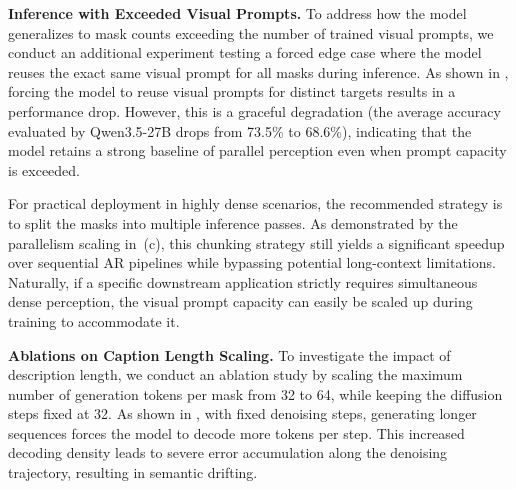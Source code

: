 \documentclass{llmxive}
\providecommand{\arraystretch}{1.3}
\begin{document}
\noindent
\textbf{Inference with Exceeded Visual Prompts.}
To address how the model generalizes to mask counts exceeding the number of trained visual prompts, we conduct an additional experiment testing a forced edge case where the model reuses the exact same visual prompt for all masks during inference. As shown in , forcing the model to reuse visual prompts for distinct targets results in a performance drop. However, this is a graceful degradation (the average accuracy evaluated by Qwen3.5-27B drops from 73.5\% to 68.6\%), indicating that the model retains a strong baseline of parallel perception even when prompt capacity is exceeded. 

For practical deployment in highly dense scenarios, the recommended strategy is to split the masks into multiple inference passes. As demonstrated by the parallelism scaling in~(c), this chunking strategy still yields a significant speedup over sequential AR pipelines while bypassing potential long-context limitations. Naturally, if a specific downstream application strictly requires simultaneous dense perception, the visual prompt capacity can easily be scaled up during training to accommodate it.  

\begin{table}[htbp]
\centering
\setlength{\tabcolsep}{6pt}
\renewcommand{\arraystretch}{1.15}
\caption{Inference with Exceeded Visual Prompts (Evaluated using Qwen3.5-27B Judge).}
\label{tab:exceeded_prompts}
\end{table}

\noindent
\textbf{Ablations on Caption Length Scaling.}
To investigate the impact of description length, we conduct an ablation study by scaling the maximum number of generation tokens per mask from 32 to 64, while keeping the diffusion steps fixed at 32. As shown in , with fixed denoising steps, generating longer sequences forces the model to decode more tokens per step. This increased decoding density leads to severe error accumulation along the denoising trajectory, resulting in semantic drifting.
\end{document}
